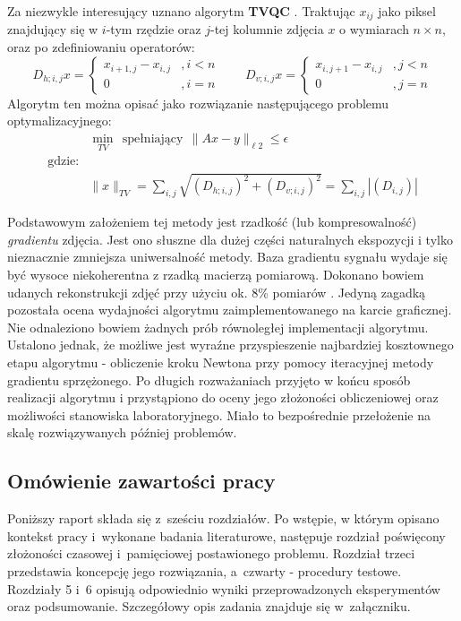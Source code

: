 Za niezwykle interesujący uznano algorytm \textbf{TVQC} \cite{Candes2005a,Candes2005b}. Traktując $x_{ij}$ jako piksel znajdujący się w $i$-tym rzędzie oraz $j$-tej kolumnie zdjęcia $x$ o wymiarach $n \times n$, oraz po zdefiniowaniu operatorów:
\begin{equation}
	D_{h;i,j}x = \begin{cases}
					x_{i+1,j} - x_{i,j} &, i < n \\
					0 &, i = n 
				 \end{cases} 
				 \qquad
	D_{v;i,j}x = \begin{cases}
					x_{i,j+1} - x_{i,j} &, j < n \\
					0 &, j = n
				 \end{cases}			 
\end{equation}
Algorytm ten można opisać jako rozwiązanie następującego problemu optymalizacyjnego:
\begin{equation}
\begin{split}
& \min_{TV} ~~\text{spełniający}~~\|Ax - y \|_{\ell 2} \le \epsilon \\
\text{gdzie:} &\\
              & \|x \|_{TV} = \sum_{i,j} \sqrt{ \left( D_{h;i,j} \right)^2 + \left( D_{v;i,j} \right) ^2} = \sum_{i,j}|\left(D_{i,j}\right) |
\label{eq:TV}
\end{split}
\end{equation}

Podstawowym założeniem tej metody jest rzadkość (lub kompresowalność) \textit{gradientu} zdjęcia. Jest ono słuszne dla dużej części naturalnych ekspozycji i tylko nieznacznie zmniejsza uniwersalność metody. Baza gradientu sygnału wydaje się być wysoce niekoherentna z rzadką macierzą pomiarową. Dokonano bowiem udanych rekonstrukcji zdjęć przy użyciu ok. 8\% pomiarów \cite{Berinde2008}. Jedyną zagadką pozostała ocena wydajności algorytmu zaimplementowanego na karcie graficznej. Nie odnaleziono bowiem żadnych prób równoległej implementacji algorytmu. Ustalono jednak\cite{Tarsa2012, Bolz2003}, że możliwe jest wyraźne przyspieszenie najbardziej kosztownego etapu algorytmu - obliczenie kroku Newtona przy pomocy iteracyjnej metody gradientu sprzężonego. Po długich rozważaniach przyjęto w końcu sposób realizacji algorytmu i przystąpiono do oceny jego złożoności obliczeniowej oraz możliwości stanowiska laboratoryjnego. Miało to bezpośrednie przełożenie na skalę rozwiązywanych później problemów.

\subsection{Omówienie zawartości pracy}
Poniższy raport składa się z~sześciu rozdziałów. Po wstępie, w którym opisano kontekst pracy i~wykonane badania literaturowe, następuje rozdział poświęcony złożoności czasowej i~pamięciowej postawionego problemu. Rozdział trzeci przedstawia koncepcję jego rozwiązania, a~czwarty - procedury testowe. Rozdziały 5 i~6 opisują odpowiednio wyniki przeprowadzonych eksperymentów oraz podsumowanie. Szczegółowy opis zadania znajduje się w~załączniku.
